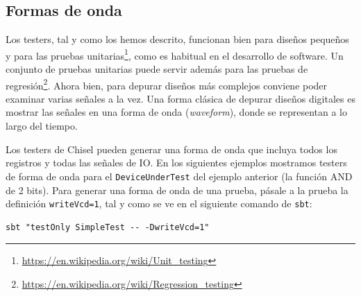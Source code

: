 \documentclass[%
    10pt,
    headinclude, footinclude=false,
    openright, %
    notitlepage,
    cleardoublepage=empty,
    headsepline,
    numbers=noenddot,
    bibliography=totoc, index=totoc,
    ]{scrbook}
\newcommand{\code}[1]{{\lstinline[basicstyle=\small\ttfamily]{#1}}}
\newcommand{\myref}[2]{\href{#1}{#2}}
\renewcommand{\myref}[2]{{#2}{\footnote{\url{#1}}}}
\begin{document}
\subsection{Formas de onda}




Los testers, tal y como los hemos descrito, funcionan bien para diseños pequeños y para las
\myref{https://en.wikipedia.org/wiki/Unit_testing}{pruebas unitarias}, como es habitual en
el desarrollo de software. Un conjunto de pruebas unitarias puede servir además para las
\myref{https://en.wikipedia.org/wiki/Regression_testing}{pruebas de regresión}. Ahora bien,
para depurar diseños más complejos conviene poder examinar varias señales a la
vez. Una forma clásica de depurar diseños digitales es mostrar las señales en una
forma de onda (\emph{waveform}), donde se representan a lo largo del tiempo.


\noindent Los testers de Chisel pueden generar una forma de onda que incluya todos los registros y todas
las señales de IO. En los siguientes ejemplos mostramos testers de forma de onda para el
\code{DeviceUnderTest} del ejemplo anterior (la función AND de 2 bits).
Para generar una forma de onda de una prueba, pásale a la prueba la definición \code{writeVcd=1},
tal y como se ve en el siguiente comando de \code{sbt}:

\begin{verbatim}
sbt "testOnly SimpleTest -- -DwriteVcd=1"
\end{verbatim}

\end{document}

